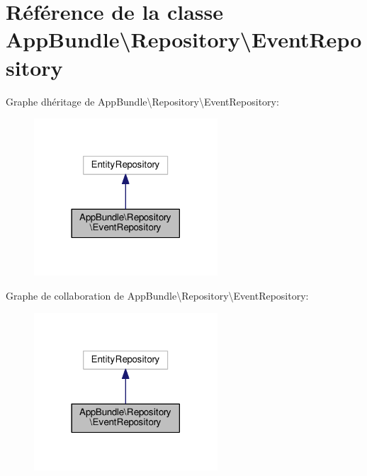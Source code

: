 \hypertarget{classAppBundle_1_1Repository_1_1EventRepository}{}\section{Référence de la classe App\+Bundle\textbackslash{}Repository\textbackslash{}Event\+Repository}
\label{classAppBundle_1_1Repository_1_1EventRepository}


Graphe d\textquotesingle{}héritage de App\+Bundle\textbackslash{}Repository\textbackslash{}Event\+Repository\+:\nopagebreak
\begin{figure}[H]
\begin{center}
\leavevmode
\includegraphics[width=194pt]{classAppBundle_1_1Repository_1_1EventRepository__inherit__graph}
\end{center}
\end{figure}


Graphe de collaboration de App\+Bundle\textbackslash{}Repository\textbackslash{}Event\+Repository\+:\nopagebreak
\begin{figure}[H]
\begin{center}
\leavevmode
\includegraphics[width=194pt]{classAppBundle_1_1Repository_1_1EventRepository__coll__graph}
\end{center}
\end{figure}


